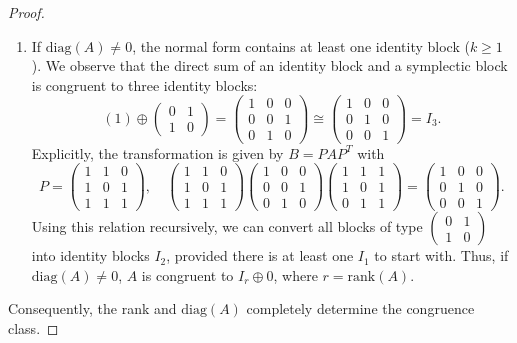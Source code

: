 \documentclass[11pt,a4paper]{article}
\theoremstyle{definition}
\begin{document}
\begin{proof}
\begin{enumerate}
		\item If $\mathrm{diag}(A) \neq 0$, the normal form contains at least one identity block ($k \ge 1$). We observe that the direct sum of an identity block and a symplectic block is congruent to three identity blocks:
		\[
		(1) \oplus \begin{pmatrix} 0 & 1 \\ 1 & 0 \end{pmatrix}
		=
		\begin{pmatrix}
			1 & 0 & 0 \\
			0 & 0 & 1 \\
			0 & 1 & 0
		\end{pmatrix}
		\cong
		\begin{pmatrix}
			1 & 0 & 0 \\
			0 & 1 & 0 \\
			0 & 0 & 1
		\end{pmatrix} = I_3.
		\]
		Explicitly, the transformation is given by $B = P A P^T$ with
		\[
		P = \begin{pmatrix}
			1 & 1 & 0 \\
			1 & 0 & 1 \\
			1 & 1 & 1
		\end{pmatrix}, \quad
		\begin{pmatrix}
			1 & 1 & 0 \\
			1 & 0 & 1 \\
			1 & 1 & 1
		\end{pmatrix}
		\begin{pmatrix}
			1 & 0 & 0 \\
			0 & 0 & 1 \\
			0 & 1 & 0
		\end{pmatrix}
		\begin{pmatrix}
			1 & 1 & 1 \\
			1 & 0 & 1 \\
			0 & 1 & 1
		\end{pmatrix}
		=
		\begin{pmatrix}
			1 & 0 & 0 \\
			0 & 1 & 0 \\
			0 & 0 & 1
		\end{pmatrix}.
		\]
		Using this relation recursively, we can convert all blocks of type $\begin{pmatrix} 0 & 1 \\ 1 & 0 \end{pmatrix}$ into identity blocks $I_2$, provided there is at least one $I_1$ to start with.
		Thus, if $\mathrm{diag}(A) \neq 0$, $A$ is congruent to $I_r \oplus 0$, where $r = \mathrm{rank}(A)$.
	\end{enumerate}
	Consequently, the rank and $\mathrm{diag}(A)$ completely determine the congruence class.
\end{proof}


\begin{small}
		
\end{small}
\end{document}
